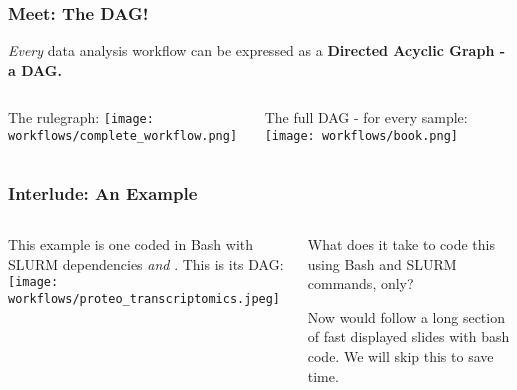 \begin{frame}[t]
 \frametitle{Meet: The DAG!}
 \begin{docs}
 	\emph{Every} data analysis workflow can be expressed as a \bf{D}irected \bf{A}cyclic \bf{G}raph - a DAG.
 \end{docs}
 \vspace{4em}
 \pause
 \begin{columns}
 	\begin{column}{0.4\textwidth}
 		\begin{minipage}[t]{\textwidth}
 			\centering
 			The rulegraph:\newline
 			\texttt{[image: workflows/complete\_workflow.png]}
 		\end{minipage}
 		
 	\end{column}
    \begin{column}{0.6\textwidth}
    	\pause
    	\begin{minipage}[t]{\textwidth}
    	   \centering
    	   The full DAG - for every sample:\newline
    	   \texttt{[image: workflows/book.png]}
        \end{minipage}
    	
    	
    \end{column}
 \end{columns}
 \vfill
\end{frame}

\begin{frame}[t]
	\frametitle{Interlude: An Example}
	\vspace{-3em}
	\begin{columns}[t]
		\begin{column}{0.6\textwidth}
			\begin{hint}[Background]
				This example is one coded in Bash with SLURM dependencies \emph{and} \Snakemake. This is its DAG:
				\texttt{[image: workflows/proteo\_transcriptomics.jpeg]} 
			\end{hint}
		\end{column}
	    \begin{column}{0.4\textwidth}
	    	\begin{question}
	    		What does it take to code this using Bash and SLURM commands, only?
	    	\end{question}
    	    \pause
    	    \begin{warning}
    	    	Now would follow a long section of fast displayed slides with bash code. We will skip this to save time.
    	    \end{warning}
	    \end{column}
	\end{columns}
    \vfill
\end{frame}

